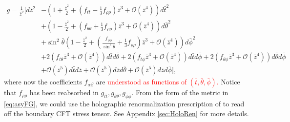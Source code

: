 \documentclass[a4paper,11pt]{article}
\numberwithin{equation}{section}
\begin{document}
\begin{align}
g=\frac{1}{\bar{z}^2}\biggl[ d\bar{z}^2 &-\left(1+\frac{\bar{z}^2}{2}+\left( \textstyle{f_{tt}-\frac{1}{3}f_{\rho\rho}}\right)\bar{z}^3+\mathcal{O}(\bar{z}^4) \right)d\bar{t}^2 \nonumber \\
&+  \left(1-\frac{\bar{z}^2}{2}+\left(\textstyle{f_{\theta\theta}+\frac{1}{3}f_{\rho\rho}} \right)\bar{z}^3 +\mathcal{O}(\bar{z}^4)\right)d\bar{\theta}^2\nonumber\\
& +   \sin^2\bar{\theta} \left(1-\frac{\bar{z}^2}{2}+\left(\textstyle{\frac{f_{\phi\phi}}{ \sin^2\bar{\theta}}+\frac{1}{3}f_{\rho\rho}}\right)\bar{z}^3 +\mathcal{O}(\bar{z}^4)\right)d\bar{\phi}^2\nonumber\\
&+ 2 \left(f_{t\theta}\bar{z}^3 +\mathcal{O}(\bar{z}^4) \right) d\bar{t} d\bar{\theta} + 2 \left( f_{t\phi}\bar{z}^3 +\mathcal{O}(\bar{z}^4)\right)d\bar{t} d\bar{\phi}  + 2\left( f_{\theta\phi} \bar{z}^3+\mathcal{O}(\bar{z}^4)\right)d\bar{\theta} d\bar{\phi} 
\nonumber\\
&+\mathcal{O}(\bar{z}^5)d\bar{t}d\bar{z}+\mathcal{O}(\bar{z}^5)d\bar{z}d\bar{\theta}+\mathcal{O}(\bar{z}^5)d\bar{z}d\bar{\phi}
\biggr],
\label{eq:asyFG}
\end{align}
where now the coefficients $f_{\alpha\beta}$ are \textcolor{red}{understood as functions of $(\bar t, \bar\theta, \bar\phi)$.}
Notice that $f_{\rho\rho}$ has been reabsorbed in $g_{\bar{t}\bar{t}}, g_{\bar{\theta}\bar{\theta}}, g_{\bar{\phi}\bar{\phi}}$. From the form of the metric in \eqref{eq:asyFG}, we could  use the holographic renormalization prescription of \cite{deHaro:2000vlm} to read off the boundary CFT stress tensor. See Appendix \ref{sec:HoloRen} for more details.
\end{document}
